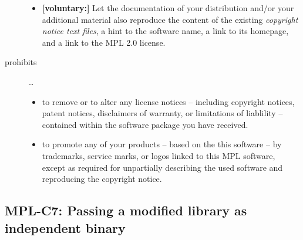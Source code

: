 \begin{description}
\begin{itemize}
  \item \textbf{[voluntary:]} Let the documentation of your distribution and/or
  your additional material  also reproduce the content of the existing
  \emph{copyright notice text files}, a hint to the software name, a link to its
  homepage, and a link to the MPL 2.0 license.

\end{itemize}

\item[prohibits] \ldots
\begin{itemize}
  \item to remove or to alter any license notices -- including copyright
  notices, patent notices, disclaimers of warranty, or limitations of liablility
  -- contained within the software package you have received.
  \item to promote any of your products -- based on the this software -- by
  trademarks, service marks, or logos linked to this MPL software, except as
  required for unpartially describing the used software and reproducing the
  copyright notice.
\end{itemize}

\end{description}


\subsection{MPL-C7: Passing a modified library as independent binary}
\label{OSUC-08B-MPL}

